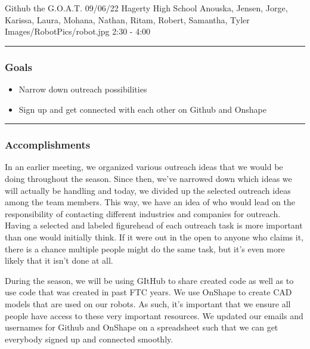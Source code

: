 \insertmeeting 
	{Github the G.O.A.T.} 
	{09/06/22}
	{Hagerty High School}
	{Anouska, Jensen, Jorge, Karissa, Laura, Mohana, Nathan, Ritam, Robert, Samantha, Tyler}
	{Images/RobotPics/robot.jpg}
	{2:30 - 4:00}
	
\noindent\hfil\rule{\textwidth}{.4pt}\hfil
\subsubsection*{Goals}
\begin{itemize}
    \item Narrow down outreach possibilities
    \item Sign up and get connected with each other on Github and Onshape
\end{itemize} 

\noindent\hfil\rule{\textwidth}{.4pt}\hfil

\subsubsection*{Accomplishments}
In an earlier meeting, we organized various outreach ideas that we would be doing throughout the season. Since then, we've narrowed down which ideas we will actually be handling and today, we divided up the selected outreach ideas among the team members. This way, we have an idea of who would lead on the responsibility of contacting different industries and companies for outreach. Having a selected and labeled figurehead of each outreach task is more important than one would initially think. If it were out in the open to anyone who claims it, there is a chance multiple people might do the same task, but it's even more likely that it isn't done at all.

During the season, we will be using GItHub to share created code as well as to use code that was created in past FTC years. We use OnShape to create CAD models that are used on our robots. As such, it's important that we ensure all people have access to these very important resources. We updated our emails and usernames for Github and OnShape on a spreadsheet such that we can get everybody signed up and connected smoothly.





